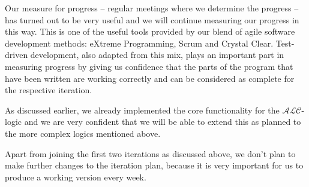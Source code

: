 Our measure for progress -- regular meetings
where we determine the progress -- has turned out to be very useful and we will continue
measuring our progress in this way. This is one of the useful tools provided by our 
blend of agile software development methods: eXtreme Programming, Scrum and Crystal Clear.
Test-driven development, also adapted from this mix, plays an important part in measuring
progress by giving us confidence that the parts of the program that have been written are
working correctly and can be considered as complete for the respective iteration.

As discussed earlier, we already implemented the
core functionality for the $\mathcal{ALC}$-logic and we are very confident that we will
be able to extend this as planned to the more complex logics mentioned above.

Apart from joining the first two
iterations as discussed above, we don't plan to make further changes to the iteration
plan, because it is very important for us to produce a working version every week.